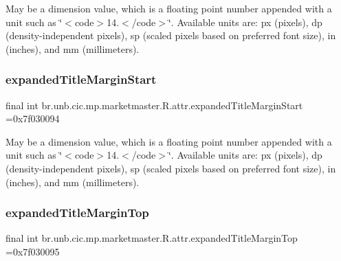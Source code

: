 May be a dimension value, which is a floating point number appended with a unit such as \char`\"{}$<$code$>$14.\+5sp$<$/code$>$\char`\"{}. Available units are\+: px (pixels), dp (density-\/independent pixels), sp (scaled pixels based on preferred font size), in (inches), and mm (millimeters). \mbox{\label{classbr_1_1unb_1_1cic_1_1mp_1_1marketmaster_1_1R_1_1attr_a511b3738509b52f72ac33cf47ae6065e}} 
\subsubsection{\texorpdfstring{expanded\+Title\+Margin\+Start}{expandedTitleMarginStart}}
{\footnotesize\ttfamily final int br.\+unb.\+cic.\+mp.\+marketmaster.\+R.\+attr.\+expanded\+Title\+Margin\+Start =0x7f030094\hspace{0.3cm}{\ttfamily [static]}}

May be a dimension value, which is a floating point number appended with a unit such as \char`\"{}$<$code$>$14.\+5sp$<$/code$>$\char`\"{}. Available units are\+: px (pixels), dp (density-\/independent pixels), sp (scaled pixels based on preferred font size), in (inches), and mm (millimeters). \mbox{\label{classbr_1_1unb_1_1cic_1_1mp_1_1marketmaster_1_1R_1_1attr_ab2325eb61b0d0692f620770bd91d2e3b}} 
\subsubsection{\texorpdfstring{expanded\+Title\+Margin\+Top}{expandedTitleMarginTop}}
{\footnotesize\ttfamily final int br.\+unb.\+cic.\+mp.\+marketmaster.\+R.\+attr.\+expanded\+Title\+Margin\+Top =0x7f030095\hspace{0.3cm}{\ttfamily [static]}}

